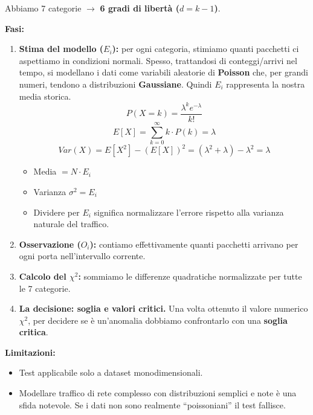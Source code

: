 Abbiamo 7 categorie $\rightarrow$ \textbf{6 gradi di libertà
($d = k - 1$)}.

\textbf{Fasi:}
\begin{enumerate}
    \item \textbf{Stima del modello ($E_i$):} per ogni categoria,
    stimiamo quanti pacchetti ci aspettiamo in condizioni normali.
    Spesso, trattandosi di conteggi/arrivi nel tempo, si modellano
    i dati come variabili aleatorie di \textbf{Poisson} che, per
    grandi numeri, tendono a distribuzioni \textbf{Gaussiane}.
    Quindi $E_i$ rappresenta la nostra media storica.
    \[
        P(X=k) = \frac{\lambda^k e^{-\lambda}}{k!}
    \]
    \[
        E[X] = \sum_{k=0}^{\infty} k \cdot P(k) = \lambda
    \]
    \[
        Var(X) = E[X^2] - (E[X])^2
               = (\lambda^2 + \lambda) - \lambda^2 = \lambda
    \]
    \begin{itemize}
        \item Media $= N \cdot E_i$
        \item Varianza $\sigma^2 = E_i$
        \item Dividere per $E_i$ significa normalizzare l'errore
              rispetto alla varianza naturale del traffico.
    \end{itemize}

    \item \textbf{Osservazione ($O_i$):} contiamo effettivamente
    quanti pacchetti arrivano per ogni porta nell'intervallo
    corrente.

    \item \textbf{Calcolo del $\chi^2$:} sommiamo le differenze
    quadratiche normalizzate per tutte le 7 categorie.

    \item \textbf{La decisione: soglia e valori critici.} Una
    volta ottenuto il valore numerico $\chi^2$, per decidere se
    è un'anomalia dobbiamo confrontarlo con una
    \textbf{soglia critica}.
\end{enumerate}

\textbf{Limitazioni:}
\begin{itemize}
    \item Test applicabile solo a dataset monodimensionali.
    \item Modellare traffico di rete complesso con distribuzioni
          semplici e note è una sfida notevole. Se i dati non
          sono realmente ``poissoniani'' il test fallisce.
\end{itemize}

